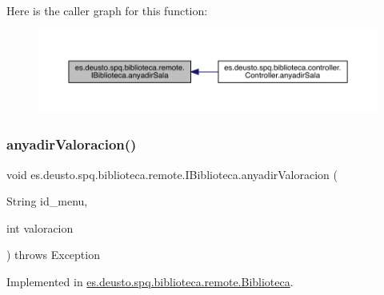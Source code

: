 Here is the caller graph for this function\+:
\nopagebreak
\begin{figure}[H]
\begin{center}
\leavevmode
\includegraphics[width=350pt]{interfacees_1_1deusto_1_1spq_1_1biblioteca_1_1remote_1_1_i_biblioteca_a3f32377ccce2450ce8154902b470bf5b_icgraph}
\end{center}
\end{figure}
\mbox{\label{interfacees_1_1deusto_1_1spq_1_1biblioteca_1_1remote_1_1_i_biblioteca_a72b9d5541556bacfdfb37f47753972c1}} 
\subsubsection{\texorpdfstring{anyadir\+Valoracion()}{anyadirValoracion()}}
{\footnotesize\ttfamily void es.\+deusto.\+spq.\+biblioteca.\+remote.\+I\+Biblioteca.\+anyadir\+Valoracion (\begin{DoxyParamCaption}\item[{String}]{id\+\_\+menu,  }\item[{int}]{valoracion }\end{DoxyParamCaption}) throws Exception}



Implemented in \mbox{\hyperlink{classes_1_1deusto_1_1spq_1_1biblioteca_1_1remote_1_1_biblioteca_a8657b2e8a0f290b26854518289c4b977}{es.\+deusto.\+spq.\+biblioteca.\+remote.\+Biblioteca}}.

